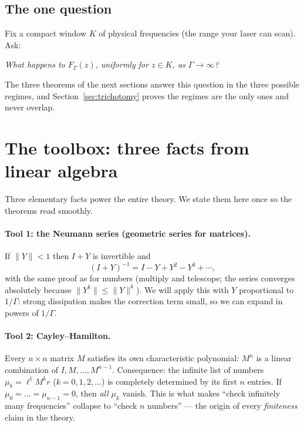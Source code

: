 \documentclass[11pt]{article}
\begin{document}
\subsection{The one question}

Fix a compact window $K$ of physical frequencies (the range your laser can
scan).  Ask:
\begin{center}
\emph{What happens to $F_\Gamma(z)$, uniformly for $z\in K$, as
$\Gamma\to\infty$?}
\end{center}
The three theorems of the next sections answer this question in the three
possible regimes, and Section~\ref{sec:trichotomy} proves the regimes are the
only ones and never overlap.

\section{The toolbox: three facts from linear algebra}
\label{sec:toolbox}

Three elementary facts power the entire theory.  We state them here once so
the theorems read smoothly.

\paragraph{Tool 1: the Neumann series (geometric series for matrices).}
If $\|Y\|<1$ then $I+Y$ is invertible and
\[
(I+Y)^{-1}=I-Y+Y^2-Y^3+\cdots,
\]
with the same proof as for numbers (multiply and telescope; the series
converges absolutely because $\|Y^k\|\le\|Y\|^k$).  We will apply this with
$Y$ proportional to $1/\Gamma$: strong dissipation makes the correction term
small, so we can expand in powers of $1/\Gamma$.

\paragraph{Tool 2: Cayley--Hamilton.}
Every $n\times n$ matrix $M$ satisfies its own characteristic polynomial:
$M^n$ is a linear combination of $I,M,\dots,M^{n-1}$.  Consequence: the
infinite list of numbers $\mu_k=\ell^\dagger M^k r$ ($k=0,1,2,\dots$) is
completely determined by its first $n$ entries.  If
$\mu_0=\dots=\mu_{n-1}=0$, then \emph{all} $\mu_k$ vanish.  This is what
makes ``check infinitely many frequencies'' collapse to ``check $n$
numbers'' --- the origin of every \emph{finiteness} claim in the theory.
\end{document}
